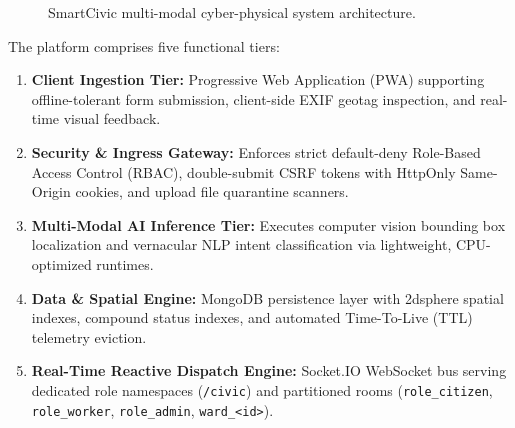 \documentclass[conference]{IEEEtran}
\begin{document}
\begin{figure}[htbp]
\centering
{}
\caption{SmartCivic multi-modal cyber-physical system architecture.}
\label{fig:arch}
\end{figure}

The platform comprises five functional tiers:
\begin{enumerate}
    \item \textbf{Client Ingestion Tier:} Progressive Web Application (PWA) supporting offline-tolerant form submission, client-side EXIF geotag inspection, and real-time visual feedback.
    \item \textbf{Security \& Ingress Gateway:} Enforces strict default-deny Role-Based Access Control (RBAC), double-submit CSRF tokens with HttpOnly Same-Origin cookies, and upload file quarantine scanners.
    \item \textbf{Multi-Modal AI Inference Tier:} Executes computer vision bounding box localization and vernacular NLP intent classification via lightweight, CPU-optimized runtimes.
    \item \textbf{Data \& Spatial Engine:} MongoDB persistence layer with 2dsphere spatial indexes, compound status indexes, and automated Time-To-Live (TTL) telemetry eviction.
    \item \textbf{Real-Time Reactive Dispatch Engine:} Socket.IO WebSocket bus serving dedicated role namespaces (\texttt{/civic}) and partitioned rooms (\texttt{role\_citizen}, \texttt{role\_worker}, \texttt{role\_admin}, \texttt{ward\_<id>}).
\end{enumerate}
\end{document}
